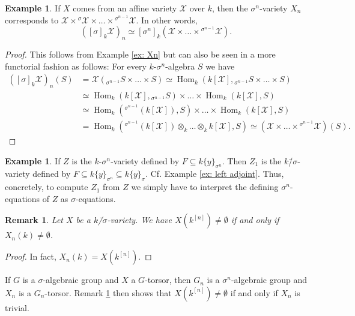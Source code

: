 \documentclass[oneside,reqno]{amsart}
\newtheorem{prop}[theo]{Proposition}
\newtheorem{rem}[theo]{Remark}
\theoremstyle{definition}
\newtheorem{ex}[theo]{Example}
\newcommand{\Hom}{\operatorname{Hom}}
\newcommand{\X}{\mathcal{X}}
\newcommand{\s}{\sigma}
\newcommand{\hs}{{{}^\sigma\!}}
\newcommand{\ks}{$k$\=/$\s$}
\newcommand{\kn}{k^{[n]}}
\begin{document}
\begin{ex} \label{ex: varieties and Xn}
	If $X$ comes from an affine variety $\X$ over $k$, then the $\s^n$-variety $X_n$ corresponds to $\X\times{\hs \X}\times\ldots\times{^{\s^{n-1}}\!\X}$. In other words,
	$$([\s]_k\X)_n\simeq[\s^n]_k(\X\times\ldots\times{^{\s^{n-1}}\!\X}).$$
\end{ex}
\begin{proof}
	This follows from Example \ref{ex: Xn} but can also be seen in a more functorial fashion as follows: For every $k$-$\s^n$-algebra $S$ we have
\begin{align*}
	([\s]_k\X)_n(S) & =\X({_{\s^{n-1}}}S\times\ldots\times S)\simeq\Hom_k(k[\X],{_{\s^{n-1}}}S\times\ldots\times S) \\
	& \simeq\Hom_k(k[\X],{_{\s^{n-1}}}S)\times\ldots\times \Hom_k(k[\X],S) \\
	&\simeq\Hom_k({^{\s^{n-1}}}(k[\X]),S)\times\ldots\times \Hom_k(k[\X],S) \\
	& = \Hom_k({^{\s^{n-1}}}(k[\X])\otimes_k\ldots\otimes_k k[\X],S)\simeq (\X\times\ldots\times{^{\s^{n-1}}\!\X})(S).
	\end{align*}
\end{proof}

\begin{ex}
	If $Z$ is the $k$-$\s^n$-variety defined by $F\subseteq k\{y\}_{\s^n}$. Then $Z_1$ is the \ks-variety defined by $F\subseteq k\{y\}_{\s^n}\subseteq k\{y\}_\s$. Cf. Example \ref{ex: left adjoint}. Thus, concretely, to compute $Z_1$ from $Z$ we simply have to interpret the defining $\s^n$-equations of $Z$ as $\s$-equations.
\end{ex}	

 \begin{rem} \label{rem: points k vs kn}
 	Let $X$ be a \ks-variety. We have $X(\kn)\neq\emptyset$ if and only if $X_n(k)\neq\emptyset$.
 \end{rem}
 \begin{proof}
 	In fact, $X_n(k)=X(\kn)$.   
 \end{proof}

If $G$ is a $\s$-algebraic group and $X$ a $G$-torsor, then $G_n$ is a $\s^n$-algebraic group and $X_n$ is a $G_n$-torsor. Remark \ref{rem: points k vs kn} then shows that $X(\kn)\neq\emptyset$ if and only if $X_n$ is trivial.

 
% 
 
\end{document}

